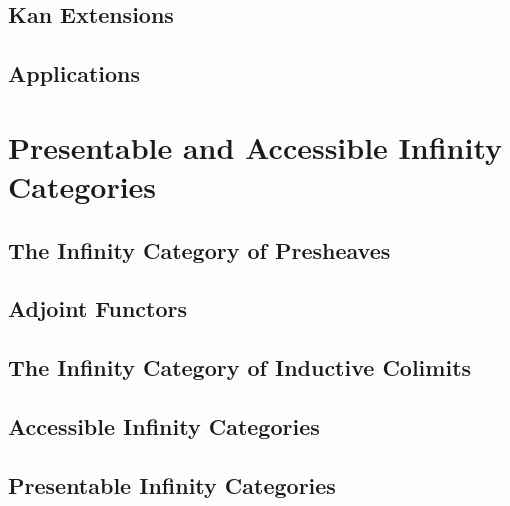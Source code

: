 \documentclass[12pt]{report}
\begin{document}


\subsection{Kan Extensions}



\subsection{Applications}



\section{Presentable and Accessible Infinity Categories}

\subsection{The Infinity Category of Presheaves}



\subsection{Adjoint Functors}



\subsection{The Infinity Category of Inductive Colimits}



\subsection{Accessible Infinity Categories}



\subsection{Presentable Infinity Categories}


\end{document}
